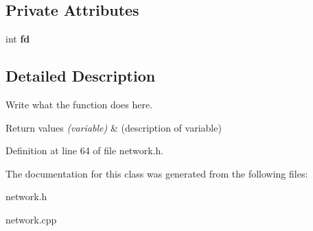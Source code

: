 \subsection*{Private Attributes}
\begin{DoxyCompactItemize}
\item 
\hypertarget{classNetworkServer_a3a4cbba07f7c425a9147f8a21b714e7f}{int {\bfseries fd}}\label{classNetworkServer_a3a4cbba07f7c425a9147f8a21b714e7f}

\end{DoxyCompactItemize}


\subsection{Detailed Description}
Write what the function does here. 


\begin{DoxyRetVals}{Return values}
{\em (variable)} & (description of variable) \\
\hline
\end{DoxyRetVals}


Definition at line 64 of file network.\+h.



The documentation for this class was generated from the following files\+:\begin{DoxyCompactItemize}
\item 
network.\+h\item 
network.\+cpp\end{DoxyCompactItemize}
